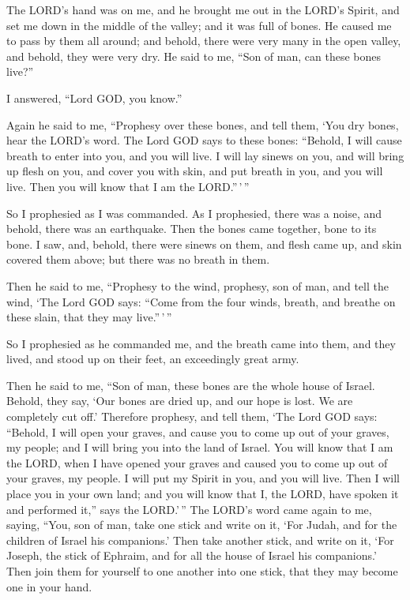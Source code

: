  The LORD's hand was on me, and he brought me out in the
LORD's Spirit, and set me down in the middle of the valley; and it was
full of bones.  He caused me to pass by them all around; and
behold, there were very many in the open valley, and behold, they were
very dry.  He said to me, ``Son of man, can these bones
live?''

I answered, ``Lord GOD, you know.''

 Again he said to me, ``Prophesy over these bones, and tell
them, `You dry bones, hear the LORD's word.  The Lord GOD
says to these bones: ``Behold, I will cause breath to enter into you,
and you will live.  I will lay sinews on you, and will bring
up flesh on you, and cover you with skin, and put breath in you, and you
will live. Then you will know that I am the LORD.''\,'\,''

 So I prophesied as I was commanded. As I prophesied, there
was a noise, and behold, there was an earthquake. Then the bones came
together, bone to its bone.  I saw, and, behold, there were
sinews on them, and flesh came up, and skin covered them above; but
there was no breath in them.

 Then he said to me, ``Prophesy to the wind, prophesy, son
of man, and tell the wind, `The Lord GOD says: ``Come from the four
winds, breath, and breathe on these slain, that they may live.''\,'\,''

 So I prophesied as he commanded me, and the breath came
into them, and they lived, and stood up on their feet, an exceedingly
great army.

 Then he said to me, ``Son of man, these bones are the
whole house of Israel. Behold, they say, `Our bones are dried up, and
our hope is lost. We are completely cut off.'  Therefore
prophesy, and tell them, `The Lord GOD says: ``Behold, I will open your
graves, and cause you to come up out of your graves, my people; and I
will bring you into the land of Israel.  You will know that
I am the LORD, when I have opened your graves and caused you to come up
out of your graves, my people.  I will put my Spirit in
you, and you will live. Then I will place you in your own land; and you
will know that I, the LORD, have spoken it and performed it,'' says the
LORD.'\,''  The LORD's word came again to me, saying,
 ``You, son of man, take one stick and write on it, `For
Judah, and for the children of Israel his companions.' Then take another
stick, and write on it, `For Joseph, the stick of Ephraim, and for all
the house of Israel his companions.'  Then join them for
yourself to one another into one stick, that they may become one in your
hand.

